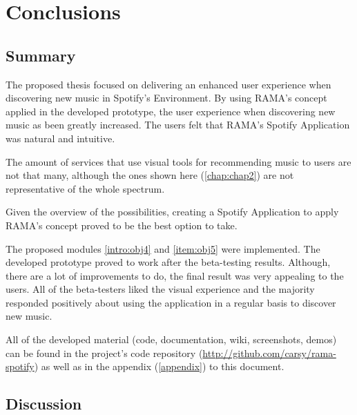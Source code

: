 
\chapter{Conclusions}
\label{chap:chap5}

\section*{}


\section{Summary} %
\label{sec:summary}

  The proposed thesis focused on delivering an enhanced user experience when discovering new music in Spotify's Environment.
  By using RAMA's concept applied in the developed prototype, the user experience when discovering new music as been greatly increased.
  The users felt that RAMA's Spotify Application was natural and intuitive.

  The amount of services that use visual tools for recommending music to users are not that many, although the ones shown here (\ref{chap:chap2}) are not representative of the whole spectrum.

  Given the overview of the possibilities, creating a Spotify Application to apply RAMA's concept proved to be the best option to take.

  The proposed modules \ref{intro:obj4} and \ref{item:obj5} were implemented.
  The developed prototype proved to work after the beta-testing results.
  Although, there are a lot of improvements to do, the final result was very appealing to the users.
  All of the beta-testers liked the visual experience and the majority responded positively about using the application in a regular basis to discover new music.

  All of the developed material (code, documentation, wiki, screenshots, demos) can be found in the project's code repository (\url{http://github.com/carsy/rama-spotify}) as well as in the appendix (\ref{appendix}) to this document.



\section{Discussion} %
\label{sec:discussion}

